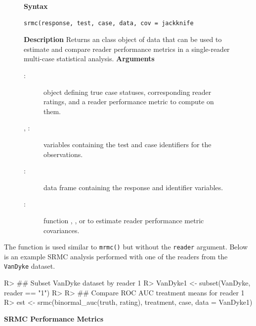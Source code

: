 \documentclass[
]{jss}
\newenvironment{Description}{\textbf{Description}\vspace{0.5em}\newline}{\vspace{0.5em}\newline}
\begin{document}
\begin{figure}[h]
\begin{tcolorbox}[title=SRMC Function]
\textbf{Syntax}
\begin{verbatim}
srmc(response, test, case, data, cov = jackknife
\end{verbatim}
\begin{Description}
Returns an  class object of data that can be used to estimate and compare reader performance metrics in a single-reader multi-case statistical analysis.
\end{Description}
\textbf{Arguments}
\begin{description}
\item[:] object defining true case statuses, corresponding reader ratings, and a reader performance metric to compute on them.
\item[, :] variables containing the test and case identifiers for the  observations.
\item[:] data frame containing the response and identifier variables.
\item[:] function , , or  to estimate reader performance metric covariances.
\end{description}
\end{tcolorbox}
\end{figure}

The function is used similar to \texttt{mrmc()} but without the
\texttt{reader} argument. Below is an example SRMC analysis performed
with one of the readers from the \texttt{VanDyke} dataset.

\begin{CodeChunk}
\begin{CodeInput}
R> ## Subset VanDyke dataset by reader 1
R> VanDyke1 <- subset(VanDyke, reader == "1")
R> 
R> ## Compare ROC AUC treatment means for reader 1
R> est <- srmc(binormal_auc(truth, rating), treatment, case, data = VanDyke1)
\end{CodeInput}
\end{CodeChunk}

\textbf{SRMC Performance Metrics}
\end{document}
